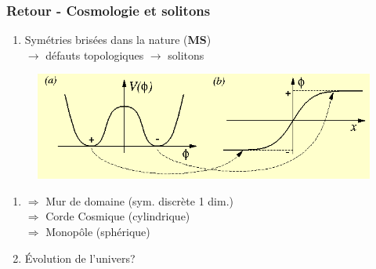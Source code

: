\documentclass[handout]{beamer}
\begin{document}
%
%
%
%
%

\begin{frame}\frametitle{Retour - Cosmologie et solitons}
\begin{enumerate}
\item Symétries brisées dans la nature (\textbf{MS})
\\$\rightarrow$ défauts topologiques $\rightarrow$ solitons

\end{enumerate}
\begin{figure}
\includegraphics[scale=0.4]{soli_def.png}
\end{figure}
\begin{enumerate}

\item $\Rightarrow$ Mur de domaine (sym. discrète 1 dim.)\\$\Rightarrow$ Corde Cosmique (cylindrique)\\$\Rightarrow$ Monopôle (sphérique)
\item Évolution de l'univers?
\end{enumerate}



\end{frame}
\end{document}

